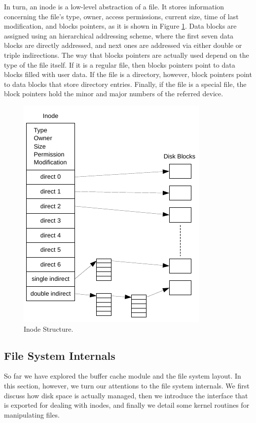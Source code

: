 \documentclass[10pt,a4paper]{article}
\begin{document}
In turn, an inode is a low-level abstraction of a file. It stores information concerning the file's type, owner, access permissions, current size, time of last modification, and blocks pointers, as it is shown in Figure \ref{figure: inode structure}. Data blocks are assigned using an hierarchical addressing scheme, where the first seven data blocks are directly addressed, and next ones are addressed via either double or triple indirections. The way that blocks pointers are actually used depend on the type of the file itself. If it is a regular file, then blocks pointers point to data blocks filled with user data. If the file is a directory, however, block pointers point to data blocks that store directory entries. Finally, if the file is a special file, the block pointers hold the minor and major numbers of the referred device.

\begin{figure}
	\centering
	\includegraphics[scale=1.1]{img/inode-structure}
	\caption{Inode Structure.}
	\label{figure: inode structure}
\end{figure}

\subsection{File System Internals}
\label{subsection: file system internals}

So far we have explored the buffer cache module and the file system layout. In this section, however, we turn our attentions to the file system internals. We first discuss how disk space is actually managed, then we introduce the interface that is exported for dealing with inodes, and finally we detail some kernel routines for manipulating files.
\end{document}

